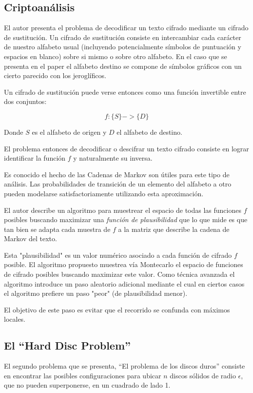 \documentclass[12pt]{article}
\begin{document}
\subsection{Criptoanálisis}

El autor presenta el problema de decodificar un texto cifrado mediante un cifrado de sustitución. Un cifrado de sustitución consiste en intercambiar cada carácter de nuestro alfabeto usual (incluyendo potencialmente símbolos de puntuación y espacios en blanco) sobre si mismo o sobre otro alfabeto. En el caso que se presenta en el paper el alfabeto destino se compone de símbolos gráficos con un cierto parecido con los jeroglíficos.

Un cifrado de sustitución puede verse entonces como una función invertible entre dos conjuntos:

$$f: \{S\} -> \{D\}$$

Donde $S$ es el alfabeto de origen y $D$ el alfabeto de destino. 

El problema entonces de decodificar o descifrar un texto cifrado consiste en lograr identificar la función $f$ y naturalmente su inversa.

Es conocido el hecho de las Cadenas de Markov son útiles para este tipo de análisis. Las probabilidades de transición de un elemento del alfabeto a otro pueden modelarse satisfactoriamente utilizando esta aproximación.

El autor describe un algoritmo para muestrear el espacio de todas las funciones $f$ posibles buscando maximizar una \emph{función de plausibilidad} que lo que mide es que tan bien se adapta cada muestra de $f$ a la matriz que describe la cadena de Markov del texto.

Esta "plausibilidad" es un valor numérico asociado a cada función de cifrado $f$ posible. El algoritmo propuesto muestrea vía Montecarlo el espacio de funciones de cifrado posibles buscando maximizar este valor. Como técnica avanzada el algoritmo introduce un paso aleatorio adicional mediante el cual en ciertos casos el algoritmo prefiere un paso "peor" (de plausibilidad menor).

El objetivo de este paso es evitar que el recorrido se confunda con máximos locales.

\subsection{El ``Hard Disc Problem''}

El segundo problema que se presenta, ``El problema de los discos duros'' consiste en encontrar las posibles configuraciones para ubicar $n$ discos sólidos de radio $\epsilon$, que no pueden superponerse, en un cuadrado de lado 1.
\end{document}
